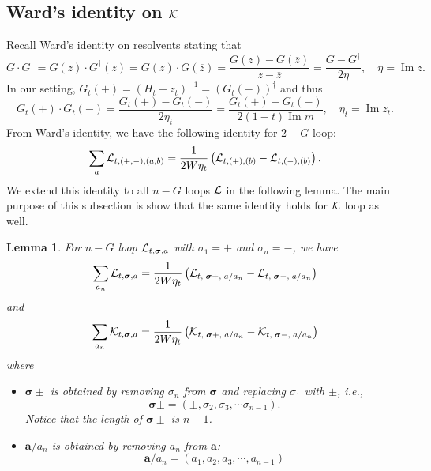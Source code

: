 \documentclass[10pt,reqno]{article}
\DeclareMathOperator{\im}{{\mathrm{Im}}}
\renewcommand{\bar}{\overline}
\theoremstyle{plain} %
\newtheorem{lemma}[theorem]{Lemma}
\theoremstyle{remark}
\numberwithin{equation}{section}
\begin{document}
\subsection{Ward's identity on \texorpdfstring{$\cal K$}{K}}
Recall  Ward's identity on resolvents stating that 
$$
G \cdot G^\dagger =G(z)\cdot G^\dagger(z)=G(z)\cdot G(\bar z)=\frac{G(z)-G(\bar z)}{z-\bar z}= \frac{G-G^\dagger}{2\eta}, \quad \eta=\im z.
$$
In our setting, $G_t(+)=(H_t-z_t)^{-1}=\left(G_t(-)\right)^\dagger $ and thus
\begin{equation}
    \label{WI_2G}
G_t(+)\cdot G_t(-)= \frac{G_t(+)-G_t(-)}{2\eta_t}=\frac{G_t(+)-G_t(-)}{ 2 (1-t)\im m},\quad \eta_t=\im z_t.
\end{equation}
 From Ward's identity, we  have the following identity for $2-G$ loop: 
$$
\sum_a {\cal L}_{t, (+,-), (a,b)}=\frac{1}{2W\eta_t}\left({\cal L}_{t, (+), (b)}-{\cal L}_{t, (-), (b)}\right).
$$
We extend this identity  to all $n-G$ loops ${\cal L}$  in the following lemma. The main purpose of this subsection is show that the same identity holds for  $\cal K$
loop as well. 

\begin{lemma}\label{lem_WI_K} For $n-G$ loop ${\cal L}_{t, \boldsymbol{\sigma}, \textbf{a}}$ with 
$\sigma_1=+$ and $\sigma_n=-$, 
we have
\begin{equation}\label{WI_calL}
  \sum_{a_n}{\cal L}_{t, \boldsymbol{\sigma}, \textbf{a}}=
\frac{1}{2W\eta_t}\left({\cal L}_{t, \; \boldsymbol{\sigma}+,  \; \textbf{a}/a_n}- {\cal L}_{t, \; \boldsymbol{\sigma}-,  \; \textbf{a}/a_n}\right)  
\end{equation}
and
\begin{equation}\label{WI_calK}
  \sum_{a_n}{\cal K}_{t, \boldsymbol{\sigma}, \textbf{a}}=
\frac{1}{2W\eta_t}\left({\cal K}_{t, \; \boldsymbol{\sigma}+,  \; \textbf{a}/a_n}
- {\cal K}_{t, \; \boldsymbol{\sigma}-,  \; \textbf{a}/a_n}\right)  
\end{equation}
where 
\begin{itemize}
\item  $\boldsymbol{\sigma}\pm$ is obtained by removing $\sigma_n$ from $\boldsymbol{\sigma}$ and replacing $\sigma_1$ with $\pm$, i.e., 
    $$
\boldsymbol{\sigma}\pm=(\pm, \sigma_2, \sigma_3,\cdots \sigma_{ n-1}).$$
Notice that  the length of $\boldsymbol{\sigma}\pm$ is $n-1$. 
\item  $\textbf{a}/a_n$ is obtained by removing $a_n$ from $\textbf{a}$:
 $$
\textbf{a}/a_n=(a_1, a_2,a_3,\cdots, a_{n-1})
$$
\end{itemize}
\end{lemma}
\end{document}
